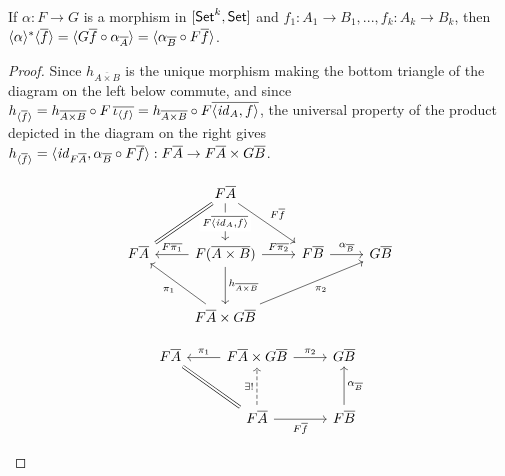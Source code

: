 \documentclass[runningheads]{llncs}
\renewcommand{\id}{\mathit{id}}
\renewcommand{\id}{\mathit{id}}
\begin{document}
\begin{lemma}\label{lem:eq-reln-equalities}
If $\alpha : F \to G$ is a morphism in $[\mathsf{Set}^k, \mathsf{Set}]$
and $f_1: A_1 \to B_1, ..., f_k : A_k \to B_k$,
then $\langle {\alpha} \rangle^* \langle {\overline{f}} \rangle
= \langle G \overline{f} \circ \alpha_{\overline{A}} \rangle
= \langle \alpha_{\overline{B}} \circ F \overline{f} \rangle$.
\end{lemma}
\begin{proof}
Since $h_{\overline{A \times B}}$ is the unique morphism making the
bottom triangle of the diagram on the left below commute, and since
$h_{\graph{\overline{f}}} = h_{\overline{A \times B}} \circ F
\,\ol{\iota_{\graph{f}}} = h_{\overline{A \times B}} \circ F
\overline{\langle \id_A, f \rangle}$, the universal property of the
product depicted in the diagram on the right gives
$h_{\graph{\overline{f}}} = \langle \id_{F \ol{A}}, \alpha_{\ol{B}}
\circ F\ol{f} \rangle : F \ol{A} \to F \ol{A} \times G \ol{B}$.

\begin{figure*}[ht]
  \vspace*{-0.15in}
  \begin{minipage}[b]{0.45\linewidth}
{\footnotesize
\[\begin{tikzcd}[row sep = large]
        &F\overline{A}
        \ar[d, "{F \overline{\langle \id_A, f \rangle}}" description]
        \ar[dl, equal]
        \ar[dr, "{F\ol{f}}"]\\
        F\overline{A}
        &F(\overline{A \times B})
        \ar[l, "{F\overline{\pi_1}}"']
        \ar[r, "{F\overline{\pi_2}}"]
        \ar[d, "{h_{\overline{A \times B}}}"]
        &F\overline{B}
        \ar[r, "{\alpha_{\ol{B}}}"]
        &G\overline{B}\\
        &F\overline{A} \times G\overline{B}
        \ar[ul, "{\pi_1}"] \ar[urr, "{\pi_2}"']
\end{tikzcd}\]}
\end{minipage}
  \begin{minipage}[b]{0.45\linewidth}
{\footnotesize
\[
      \begin{tikzcd}[row sep = large]
          F\overline{A}
          &F\overline{A} \times G\overline{B}
          \ar[l, "{\pi_1}"'] \ar[r, "{\pi_2}"]
          &G\overline{B}\\
          &F\overline{A}
          \ar[u, dashed, "{\exists !}"]
          \ar[ul, equal]
          \ar[r, "{F\ol{f}}"']
          &F{\ol{B}}
          \ar[u, "{\alpha_{\ol{B}}}"']
      \end{tikzcd}
      \]}
\end{minipage}
\end{figure*}


\end{proof}
\end{document}

